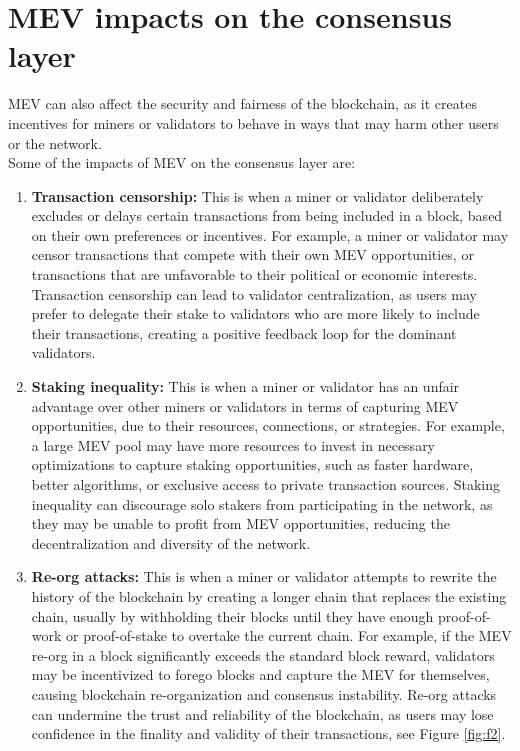 \documentclass{report}
\begin{document}
\section{MEV impacts on the consensus layer}
MEV can also affect the security and fairness of the blockchain, as it creates incentives for miners or validators to behave in ways that may harm other users or the network.\\
Some of the impacts of MEV on the consensus layer are:
\begin{enumerate}
	\item \textbf{Transaction censorship:} This is when a miner or validator deliberately excludes or delays certain transactions from being included in a block, based on their own preferences or incentives. For example, a miner or validator may censor transactions that compete with their own MEV opportunities, or transactions that are unfavorable to their political or economic interests. Transaction censorship can lead to validator centralization, as users may prefer to delegate their stake to validators who are more likely to include their transactions, creating a positive feedback loop for the dominant validators.
	\item \textbf{Staking inequality:} This is when a miner or validator has an unfair advantage over other miners or validators in terms of capturing MEV opportunities, due to their resources, connections, or strategies. For example, a large MEV pool may have more resources to invest in necessary optimizations to capture staking opportunities, such as faster hardware, better algorithms, or exclusive access to private transaction sources. Staking inequality can discourage solo stakers from participating in the network, as they may be unable to profit from MEV opportunities, reducing the decentralization and diversity of the network.
	\item \textbf{Re-org attacks:} This is when a miner or validator attempts to rewrite the history of the blockchain by creating a longer chain that replaces the existing chain, usually by withholding their blocks until they have enough proof-of-work or proof-of-stake to overtake the current chain. For example, if the MEV re-org in a block significantly exceeds the standard block reward, validators may be incentivized to forego blocks and capture the MEV for themselves, causing blockchain re-organization and consensus instability. Re-org attacks can undermine the trust and reliability of the blockchain, as users may lose confidence in the finality and validity of their transactions, see Figure \ref{fig:f2}.
\end{enumerate}
\end{document}
